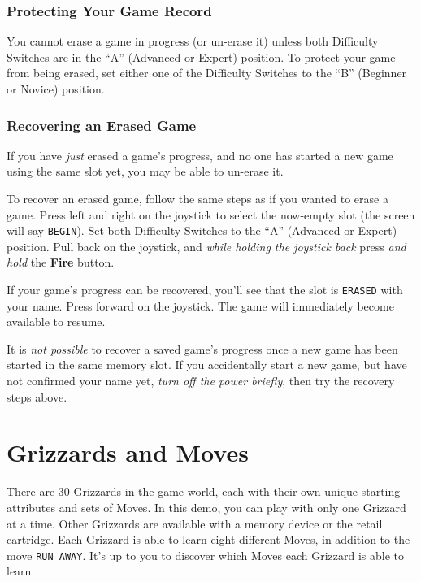 \documentclass[9pt,twocolumn,openany,article]{memoir}
\begin{document}
\subsection{Protecting Your Game Record}

You  cannot erase  a  game  in progress  (or  un-erase  it) unless  both
Difficulty  Switches are  in the  ``A'' (Advanced  or Expert)  position.
To protect your game from being erased, set either one of the Difficulty
Switches to the ``B'' (Beginner or Novice) position.

\ifdefined\DEMO\else

\subsection{Recovering an Erased Game}

If you have \emph{just} erased a game's progress, and no one has started
a new game using the same slot yet, you may be able to un-erase it.

To recover  an erased game,  follow the same steps  as if you  wanted to
erase  a game.  Press  left and  right  on the  joystick  to select  the
now-empty slot (the screen will say \texttt{BEGIN}). Set both Difficulty
Switches to  the ``A'' (Advanced or  Expert) position. Pull back  on the
joystick,  and \emph{while  holding the  joystick back}  press \emph{and
  hold} the \textbf{Fire} button.

If your  game's progress can be  recovered, you'll see that  the slot is
\texttt{ERASED} with your name. Press  forward on the joystick. The game
will immediately become available to resume.

It is \emph{not possible} to recover  a saved game's progress once a new
game has been started in the same memory slot. If you accidentally start
a new  game, but have  not confirmed your  name yet, \emph{turn  off the
  power briefly}, then try the recovery steps above.

\fi

\fi %

\chapter{Grizzards and Moves}\label{ch:Grizzards}

There are  30 Grizzards in  the game world,  each with their  own unique
starting attributes and  sets of Moves. \ifdefined\NOSAVE  In this demo,
you  can play  with only  one Grizzard  at a  time. Other  Grizzards are
available  with  a memory  device  or  the  retail cartridge.  \fi  Each
Grizzard is able to learn eight different Moves, in addition to the move
\texttt{RUN AWAY}. It's up to you  to discover which Moves each Grizzard
is able to learn.
\end{document}
